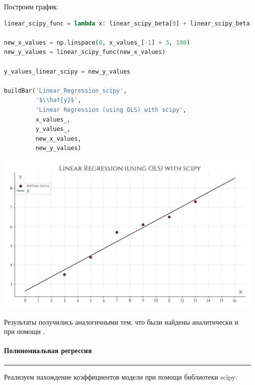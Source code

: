 \documentclass[a4paper, 14pt]{extarticle}
\begin{document}
Построим график:

\begin{center}
    \begin{lstlisting}[language=Python]
linear_scipy_func = lambda x: linear_scipy_beta[0] + linear_scipy_beta[1] * x

new_x_values = np.linspace(0, x_values_[-1] + 3, 100)
new_y_values = linear_scipy_func(new_x_values)

y_values_linear_scipy = new_y_values

buildBar('Linear_Regression_scipy', 
         '$\\hat{y}$', 
         'Linear Regression (using OLS) with scipy', 
         x_values_, 
         y_values_, 
         new_x_values, 
         new_y_values)
    \end{lstlisting}
\end{center}

\begin{center}
    \includegraphics[width=1\textwidth, height=1\textheight, keepaspectratio]{Linear_Regression_scipy} \\
\end{center}

Результаты получились аналогичными тем, что были найдены аналитически и при помощи .

\paragraph*{{Полиномиальная регрессия}}\vspace{-20pt}\rule{\linewidth}{0.1mm}

Реализуем нахождение коэффициентов модели при помощи библиотеки scipy:
\end{document}
